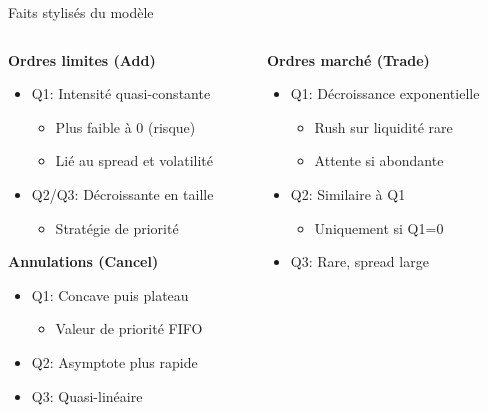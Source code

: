 \documentclass[aspectratio=169]{beamer}  %
\begin{document}
\begin{frame}{Faits stylisés du modèle}
    \begin{columns}
        \begin{column}{0.5\textwidth}
            \textbf{Ordres limites (Add)}
            \begin{itemize}
                \item \small{Q1: Intensité quasi-constante}
                \begin{itemize}
                    \item \footnotesize{Plus faible à 0 (risque)}
                    \item \footnotesize{Lié au spread et volatilité}
                \end{itemize}
                \item \small{Q2/Q3: Décroissante en taille}
                \begin{itemize}
                    \item \footnotesize{Stratégie de priorité}
                \end{itemize}
            \end{itemize}
            
            \textbf{Annulations (Cancel)}
            \begin{itemize}
                \item \small{Q1: Concave puis plateau}
                \begin{itemize}
                    \item \footnotesize{Valeur de priorité FIFO}
                \end{itemize}
                \item \small{Q2: Asymptote plus rapide}
                \item \small{Q3: Quasi-linéaire}
            \end{itemize}
        \end{column}
        \begin{column}{0.5\textwidth}
            \textbf{Ordres marché (Trade)}
            \begin{itemize}
                \item \small{Q1: Décroissance exponentielle}
                \begin{itemize}
                    \item \footnotesize{Rush sur liquidité rare}
                    \item \footnotesize{Attente si abondante}
                \end{itemize}
                \item \small{Q2: Similaire à Q1}
                \begin{itemize}
                    \item \footnotesize{Uniquement si Q1=0}
                \end{itemize}
                \item \small{Q3: Rare, spread large}
            \end{itemize}
            

\end{column}
\end{columns}
\end{frame}
\end{document}
